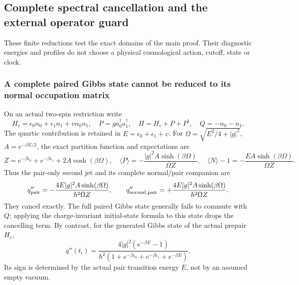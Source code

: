 \documentclass[11pt,a4paper]{article}
\begin{document}
\subsection{Complete spectral cancellation and the external operator guard}
\label{p5c:v2188:app:chargediagnostics}
These finite reductions test the exact domains of the main proof. Their
diagnostic energies and profiles do not choose a physical cosmological
action, cutoff, state or clock.

\subsubsection{A complete paired Gibbs state cannot be reduced to its normal
occupation matrix}
On an actual two-spin restriction write
\[
 H_c=\epsilon_0n_0+\epsilon_1n_1+v n_0n_1,\quad
 P=g a_0^\dagger a_1^\dagger,\quad H=H_c+P+P^\dagger,\quad Q=-n_0-n_1 .
\]
The quartic contribution is retained in \(E=\epsilon_0+\epsilon_1+v\).
For \(\Omega=\sqrt{E^2/4+|g|^2}\), \(A=e^{-\beta E/2}\), the exact
partition function and expectations are
\[
 Z=e^{-\beta\epsilon_0}+e^{-\beta\epsilon_1}
                  +2A\cosh(\beta\Omega),\quad
 \langle P\rangle=-\frac{|g|^2A\sinh(\beta\Omega)}{\Omega Z},\quad
 \langle N\rangle-1=-\frac{EA\sinh(\beta\Omega)}{\Omega Z}.
\]
Thus the pair-only second jet and its complete normal/pair companion are
\begin{equation}
 q''_{\rm pair}=-\frac{4E|g|^2A\sinh(\beta\Omega)}
                          {\hbar^2\Omega Z},\qquad
 q''_{\rm normal,pair}=+\frac{4E|g|^2A\sinh(\beta\Omega)}
                          {\hbar^2\Omega Z}.
 \label{p5c:v2188:eq:gibbscancellation}
\end{equation}
They cancel exactly. The full paired Gibbs state generally fails to
commute with \(Q\); applying the charge-invariant initial-state formula
to this state drops the cancelling term.
By contrast, for the generated Gibbs state of the actual prepair \(H_c\),
\[
 q''(t_i)=\frac{4|g|^2(e^{-\beta E}-1)}
 {\hbar^2(1+e^{-\beta\epsilon_0}
            +e^{-\beta\epsilon_1}+e^{-\beta E})}.
\]
Its sign is determined by the actual pair transition energy \(E\), not
by an assumed empty vacuum.
\end{document}
